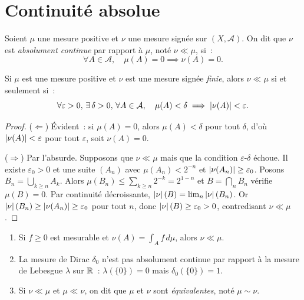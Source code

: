 \section{Continuit\'e absolue}

\begin{definition}
\label{def:abs_cont}
Soient $\mu$ une mesure positive et $\nu$ une mesure sign\'ee sur $(X, \mathcal{A})$.
On dit que $\nu$ est \emph{absolument continue} par rapport \`a $\mu$, not\'e
$\nu \ll \mu$\index{$\ll$}, si~:
\[
    \forall A \in \mathcal{A}, \quad \mu(A) = 0 \implies \nu(A) = 0.
\]
\end{definition}

\begin{proposition}
\label{prop:eps_delta}
Si $\mu$ est une mesure positive et $\nu$ est une mesure sign\'ee \emph{finie},
alors $\nu \ll \mu$ si et seulement si~:
\[
    \forall \varepsilon > 0,\, \exists\, \delta > 0,\, \forall A \in \mathcal{A},\quad
    \mu(A) < \delta \implies \left| \nu(A) \right| < \varepsilon.
\]
\end{proposition}

\begin{proof}
($\Leftarrow$) \'Evident~: si $\mu(A) = 0$, alors $\mu(A) < \delta$ pour tout
$\delta$, d'o\`u $\left| \nu(A) \right| < \varepsilon$ pour tout $\varepsilon$, soit $\nu(A) = 0$.

($\Rightarrow$) Par l'absurde. Supposons que $\nu \ll \mu$ mais que la condition
$\varepsilon$-$\delta$ \'echoue. Il existe $\varepsilon_0 > 0$ et une suite $(A_n)$
avec $\mu(A_n) < 2^{-n}$ et $\left| \nu(A_n) \right| \geq \varepsilon_0$. Posons
$B_n = \bigcup_{k \geq n} A_k$. Alors $\mu(B_n) \leq \sum_{k \geq n} 2^{-k} = 2^{1-n}$
et $B = \bigcap_n B_n$ v\'erifie $\mu(B) = 0$. Par continuit\'e d\'ecroissante,
$\left| \nu \right|(B) = \lim_n \left| \nu \right|(B_n)$. Or $\left| \nu \right|(B_n) \geq \left| \nu(A_n) \right|
\geq \varepsilon_0$ pour tout $n$, donc $\left| \nu \right|(B) \geq \varepsilon_0 > 0$,
contredisant $\nu \ll \mu$.
\end{proof}

\begin{exemple}
\begin{enumerate}
    \item Si $f \geq 0$ est mesurable et $\nu(A) = \int_A f\, d\mu$, alors $\nu \ll \mu$.
    \item La mesure de Dirac $\delta_0$ n'est pas absolument continue par rapport \`a
    la mesure de Lebesgue $\lambda$ sur $\mathbb{R}$~: $\lambda(\{0\}) = 0$ mais $\delta_0(\{0\}) = 1$.
    \item Si $\nu \ll \mu$ et $\mu \ll \nu$, on dit que $\mu$ et $\nu$ sont
    \emph{\'equivalentes}, not\'e $\mu \sim \nu$.
\end{enumerate}
\end{exemple}

